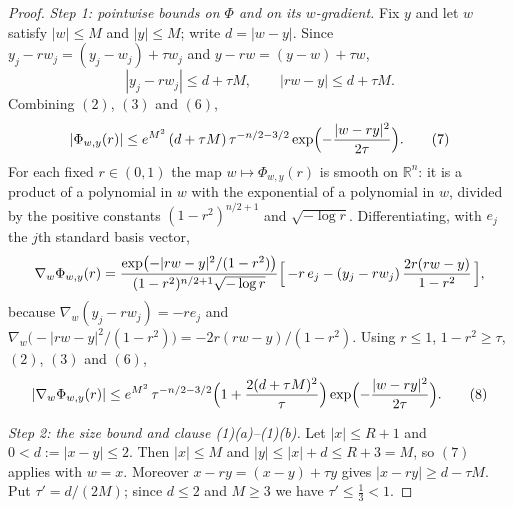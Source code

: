\begin{proof}
\emph{Step 1: pointwise bounds on $\Phi$ and on its $w$-gradient.}
Fix $y$ and let $w$ satisfy $|w| \leq M$ and $|y| \leq M$; write
$d = |w-y|$.  Since $y_j - rw_j = (y_j-w_j) + \tau w_j$ and
$y - rw = (y-w) + \tau w$,
\begin{equation*}
  |y_j - rw_j| \leq d + \tau M, \qquad |rw - y| \leq d + \tau M . \tag{6}
\end{equation*}
Combining $(2)$, $(3)$ and $(6)$,
\begin{equation*}
  |\Phi_{w,y}(r)|
    \leq e^{M^2}\,(d+\tau M)\,\tau^{-n/2-3/2}
      \exp\Bigl(-\frac{|w-ry|^2}{2\tau}\Bigr) . \tag{7}
\end{equation*}
For each fixed $r \in (0,1)$ the map $w \mapsto \Phi_{w,y}(r)$ is smooth on
$\mathbb{R}^n$: it is a product of a polynomial in $w$ with the exponential of a
polynomial in $w$, divided by the positive constants $(1-r^2)^{n/2+1}$ and
$\sqrt{-\log r}$.  Differentiating, with $e_j$ the $j$th standard basis vector,
\[
  \nabla_w\Phi_{w,y}(r)
    = \frac{\exp\bigl(-|rw-y|^2/(1-r^2)\bigr)}{(1-r^2)^{n/2+1}\sqrt{-\log r}}
      \Bigl[\,-r\,e_j - (y_j - rw_j)\,\frac{2r(rw-y)}{1-r^2}\,\Bigr] ,
\]
because $\nabla_w(y_j-rw_j) = -re_j$ and
$\nabla_w\bigl(-|rw-y|^2/(1-r^2)\bigr) = -2r(rw-y)/(1-r^2)$.  Using
$r \leq 1$, $1-r^2 \geq \tau$, $(2)$, $(3)$ and $(6)$,
\begin{equation*}
  |\nabla_w\Phi_{w,y}(r)|
    \leq e^{M^2}\,\tau^{-n/2-3/2}\Bigl(1 + \frac{2(d+\tau M)^2}{\tau}\Bigr)
      \exp\Bigl(-\frac{|w-ry|^2}{2\tau}\Bigr) . \tag{8}
\end{equation*}

\emph{Step 2: the size bound and clause (1)(a)--(1)(b).}
Let $|x| \leq R+1$ and $0 < d := |x-y| \leq 2$.  Then $|x| \leq M$ and
$|y| \leq |x| + d \leq R+3 = M$, so $(7)$ applies with $w = x$.  Moreover
$x - ry = (x-y) + \tau y$ gives $|x-ry| \geq d - \tau M$.  Put
$\tau' = d/(2M)$; since $d \leq 2$ and $M \geq 3$ we have
$\tau' \leq \tfrac13 < 1$.


\end{proof}
